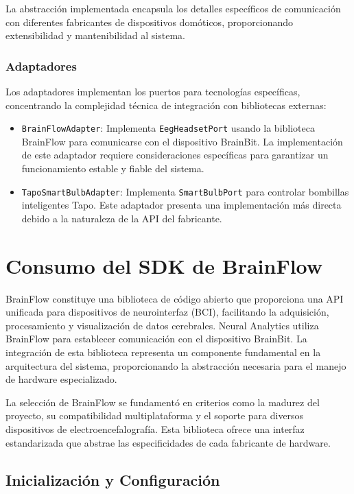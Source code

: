 La abstracción implementada encapsula los detalles específicos de comunicación con diferentes fabricantes de dispositivos domóticos, proporcionando extensibilidad y mantenibilidad al sistema.

\subsubsection{Adaptadores}

Los adaptadores implementan los puertos para tecnologías específicas, concentrando la complejidad técnica de integración con bibliotecas externas:

\begin{itemize}
    \item \texttt{BrainFlowAdapter}: Implementa \texttt{EegHeadsetPort} usando la biblioteca BrainFlow para comunicarse con el dispositivo BrainBit. La implementación de este adaptador requiere consideraciones específicas para garantizar un funcionamiento estable y fiable del sistema.
    \item \texttt{TapoSmartBulbAdapter}: Implementa \texttt{SmartBulbPort} para controlar bombillas inteligentes Tapo. Este adaptador presenta una implementación más directa debido a la naturaleza de la API del fabricante.
\end{itemize}

\section{Consumo del SDK de BrainFlow}

BrainFlow constituye una biblioteca de código abierto que proporciona una API unificada para dispositivos de neurointerfaz (BCI), facilitando la adquisición, procesamiento y visualización de datos cerebrales. Neural Analytics utiliza BrainFlow para establecer comunicación con el dispositivo BrainBit. La integración de esta biblioteca representa un componente fundamental en la arquitectura del sistema, proporcionando la abstracción necesaria para el manejo de hardware especializado.

La selección de BrainFlow se fundamentó en criterios como la madurez del proyecto, su compatibilidad multiplataforma y el soporte para diversos dispositivos de electroencefalografía. Esta biblioteca ofrece una interfaz estandarizada que abstrae las especificidades de cada fabricante de hardware.

\subsection{Inicialización y Configuración}

